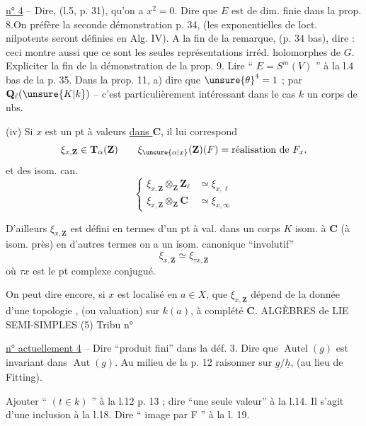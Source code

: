 \uline{n° 4} -- Dire, (l.5, p. 31), qu'on a $x^2=0$. Dire que $E$ est de dim. finie dans la prop. 8.On préfère la seconde démonstration p. 34, (les exponentielles de loct. nilpotents seront définies en Alg. IV). A la fin de la remarque, (p. 34 bas), dire : ceci montre aussi que ce sont les seules représentations irréd. holomorphes de $G$. Expliciter la fin de la démonstration de la prop. 9. Lire `` $E=S^m(V)$ '' à la l.4 bas de la p. 35. Dans la prop. 11, a) dire que $\unsure{\theta}^4=1$ ;
par $\mathbf Q_\ell(\unsure{K|k})$ -- c'est particulièrement intéressant dans le cas $k$ un corps de nbs.

(iv) Si $x$ est un pt à valeurs \uline{dans $\mathbf C$}, il lui correspond
\[
\xi_{x,\mathbf Z}\in\mathbf T_\alpha(\mathbf Z)
\qquad \xi_{\unsure{\alpha|x}}(\mathbf Z)(F)=\text{réalisation de }F_x,
\]
et des isom. can.
\[
\left\{\begin{aligned}
\xi_{x,\mathbf Z}\otimes_{\mathbf Z}\mathbf Z_\ell&\simeq\xi_{x,\ell}\\
\xi_{x,\mathbf Z}\otimes_{\mathbf Z}\mathbf C&\simeq\xi_{x,\infty}
\end{aligned}\right.
\]

D'ailleurs $\xi_{x,\mathbf Z}$ est défini en termes d'un pt à val. dans un corps  $K$ isom. à $\mathbf C$ (à isom.  près) en d'autres termes on a un isom. canonique ``involutif''
\[
\xi_{x,\mathbf Z}\simeq\xi_{\tau x,\mathbf Z}
\]
où $\tau x$ est le pt complexe conjugué.

 On peut dire encore, si $x$ est localisé en $a\in X$, que  $\xi_{x,\mathbf Z}$ dépend de la donnée d'une topologie , (ou valuation) sur $k(a)$, à complété $\mathbf C$.
ALGÈBRES de LIE SEMI-SIMPLES (5) \hfill Tribu n° 

\uline{n° actuellement 4} -- Dire ``produit fini'' dans la déf. 3. Dire que $\operatorname{Autel}(g)$ est invariant dans $\operatorname{Aut}(g)$. Au milieu de la p. 12 raisonner sur $\underline g/\underline h$, (au lieu de Fitting).

Ajouter `` $(t\in k)$ '' à la l.12 p. 13 ; dire ``une seule valeur'' à la l.14. Il s'agit d'une inclusion à la l.18. Dire `` image par F '' à la l. 19.


